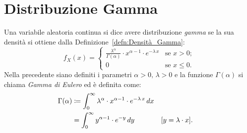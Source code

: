     \section{Distribuzione Gamma}
        \begin{defn}
            Una variabile aleatoria continua si dice avere distribuzione \textit{gamma} se la sua densità si ottiene dalla Definizione~\ref{defn:Densità_Gamma}:
            \begin{equation}\label{eq:Densità_Gamma_Eulero}
                f_{X}(x) = \begin{cases}
                    \frac{\lambda^\alpha}{\Gamma(\alpha)}\cdot x^{\alpha-1}\cdot e^{-\lambda\, x} & \text{se $x > 0$;} \\
                    0 & \text{se $x \leq 0$.}
                \end{cases}
            \end{equation}
            Nella precedente siano definiti i parametri $\alpha > 0,\, \lambda > 0$ e la funzione $\Gamma(\alpha)$ si chiama \textit{Gamma di Eulero} ed è definita come:
            \begin{align}\label{eq:Gamma_di_Eulero}
                \Gamma(\alpha) &\coloneqq \int_{0}^{\infty} \lambda^\alpha \cdot x^{\alpha -1}\cdot e^{-\lambda\, x}\, dx \notag\\
                &= \int_{0}^{\infty} y^{\alpha -1}\cdot e^{-y}\, dy & & [y=\lambda\cdot x]
            .\end{align}
        \end{defn}
